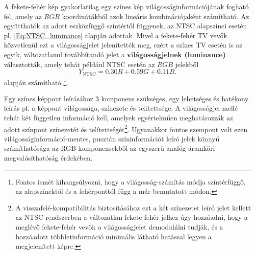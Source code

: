 A fekete-fehér kép gyakorlatilag egy színes kép világosságinformációjának fogható fel, amely az $RGB$ koordinátákból azok lineáris kombinációjaként számítható.
Az együtthatók az adott eszközfüggő színtértől függenek, az NTSC alapszínei esetén pl. \ref{Eq:NTSC_luminance} alapján adottak.
Mivel a fekete-fehér TV vevők közvetlenül ezt a világosságjelet jelenítették meg, ezért a színes TV esetén is az egyik, változatlanul továbbítandó jelet a \textbf{világosságjelnek (luminance)} választották, amely tehát például NTSC esetén az $RGB$ jelekből
\begin{equation}Y_{\mathrm{NTSC}} = 
   0.30R + 0.59G + 0.11 B. 
   \label{Eq:NTSC_luminance}
\end{equation}
alapján számítható \footnote{Fontos ismét kihangsúlyozni, hogy a világosság-számítás módja színtérfüggő, az alapszínektől és a fehérponttól függ a már bemutatott módon.}.

Egy színes képpont leírásához 3 komponens szükséges, egy lehetséges és hatékony leírás pl. a képpont világossága, színezete és telítettsége.
A világosságjel mellé tehát két független információ kell, amelyek egyértelműen meghatározzák az adott színpont színezetét és telítettségét\footnote{A visszafelé-kompatibilitás biztosításához ezt a két színezetet leíró jelet kellett az NTSC rendszerben a változatlan fekete-fehér jelhez úgy hozzáadni, hogy a meglévő fekete-fehér vevők a világosságjelet demodulálni tudják, és a hozzáadott többletinformáció minimális látható hatással legyen a megjelenített képre.}.
Ugyanakkor fontos szempont volt ezen világosságinformáció-mentes, pusztán színinformációt leíró jelek könnyű számíthatósága az RGB komponensekből az egyszerű analóg áramköri megvalósíthatóság érdekében.

